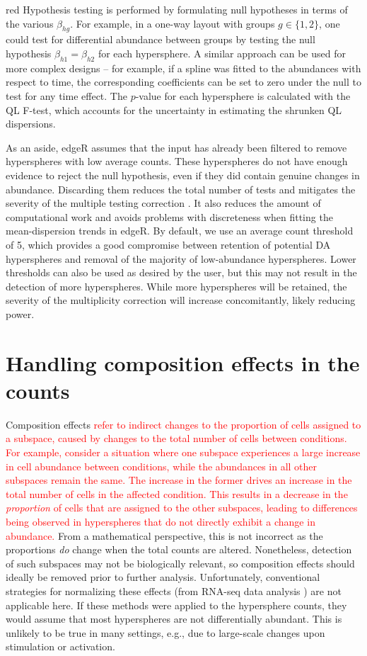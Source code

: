 \documentclass{article}
\newcommand\revised[1]{\textcolor{red}{#1}}
\begin{document}
\begin{color}{red}
Hypothesis testing is performed by formulating null hypotheses in terms of the various $\beta_{hg}$.
For example, in a one-way layout with groups $g\in\{1,2\}$, one could test for differential abundance between groups by testing the null hypothesis $\beta_{h1}=\beta_{h2}$ for each hypersphere.
A similar approach can be used for more complex designs -- for example, if a spline was fitted to the abundances with respect to time, the corresponding coefficients can be set to zero under the null to test for any time effect.
The $p$-value for each hypersphere is calculated with the QL F-test, which accounts for the uncertainty in estimating the shrunken QL dispersions. 

As an aside, edgeR assumes that the input has already been filtered to remove hyperspheres with low average counts.
These hyperspheres do not have enough evidence to reject the null hypothesis, even if they did contain genuine changes in abundance.
Discarding them reduces the total number of tests and mitigates the severity of the multiple testing correction \cite{bourgon2010independent}.
It also reduces the amount of computational work and avoids problems with discreteness when fitting the mean-dispersion trends in edgeR.
By default, we use an average count threshold of 5, which provides a good compromise between retention of potential DA hyperspheres and removal of the majority of low-abundance hyperspheres. 
Lower thresholds can also be used as desired by the user, but this may not result in the detection of more hyperspheres. 
While more hyperspheres will be retained, the severity of the multiplicity correction will increase concomitantly, likely reducing power.
\end{color}

\section{Handling composition effects in the counts}
Composition effects \revised{refer to indirect changes to the proportion of cells assigned to a subspace, caused by changes to the total number of cells between conditions.
For example, consider a situation where one subspace experiences a large increase in cell abundance between conditions, while the abundances in all other subspaces remain the same.
The increase in the former drives an increase in the total number of cells in the affected condition.
This results in a decrease in the \textit{proportion} of cells that are assigned to the other subspaces, leading to differences being observed in hyperspheres that do not directly exhibit a change in abundance.}
From a mathematical perspective, this is not incorrect as the proportions \textit{do} change when the total counts are altered.
Nonetheless, detection of such subspaces may not be biologically relevant, so composition effects should ideally be removed prior to further analysis.
Unfortunately, conventional strategies for normalizing these effects (from RNA-seq data analysis \cite{robinson2010scaling}) are not applicable here.
If these methods were applied to the hypersphere counts, they would assume that most hyperspheres are not differentially abundant.
This is unlikely to be true in many settings, e.g., due to large-scale changes upon stimulation or activation.
\end{document}
